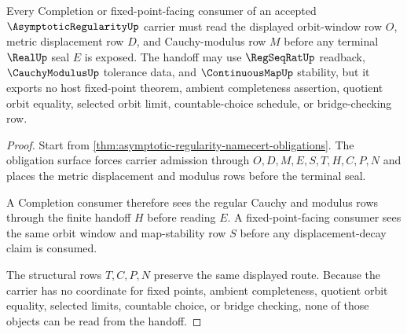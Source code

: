 \begin{theorem}
\label{thm:asymptotic-regularity-cauchy-orbit-handoff}
Every Completion or fixed-point-facing consumer of an accepted $\AsymptoticRegularityUp$ carrier must read the displayed orbit-window row $O$, metric displacement row $D$, and Cauchy-modulus row $M$ before any terminal $\RealUp$ seal $E$ is exposed. The handoff may use $\RegSeqRatUp$ readback, $\CauchyModulusUp$ tolerance data, and $\ContinuousMapUp$ stability, but it exports no host fixed-point theorem, ambient completeness assertion, quotient orbit equality, selected orbit limit, countable-choice schedule, or bridge-checking row.
\end{theorem}
\begin{proof}
Start from \autoref{thm:asymptotic-regularity-namecert-obligations}. The obligation surface forces carrier admission through $O,D,M,E,S,T,H,C,P,N$ and places the metric displacement and modulus rows before the terminal seal.

A Completion consumer therefore sees the regular Cauchy and modulus rows through the finite handoff $H$ before reading $E$. A fixed-point-facing consumer sees the same orbit window and map-stability row $S$ before any displacement-decay claim is consumed.

The structural rows $T,C,P,N$ preserve the same displayed route. Because the carrier has no coordinate for fixed points, ambient completeness, quotient orbit equality, selected limits, countable choice, or bridge checking, none of those objects can be read from the handoff.
\end{proof}




